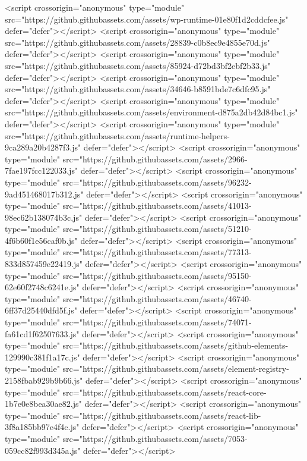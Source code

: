 <script crossorigin="anonymous" type="module" src="https://github.githubassets.com/assets/wp-runtime-01e80f1d2cddcfee.js" defer="defer"></script>
<script crossorigin="anonymous" type="module" src="https://github.githubassets.com/assets/28839-c0b8ec9e4855e70d.js" defer="defer"></script>
<script crossorigin="anonymous" type="module" src="https://github.githubassets.com/assets/85924-d72bd3bf2ebf2b33.js" defer="defer"></script>
<script crossorigin="anonymous" type="module" src="https://github.githubassets.com/assets/34646-b8591bde7c6dfc95.js" defer="defer"></script>
<script crossorigin="anonymous" type="module" src="https://github.githubassets.com/assets/environment-d875a2db42d84bc1.js" defer="defer"></script>
<script crossorigin="anonymous" type="module" src="https://github.githubassets.com/assets/runtime-helpers-9ca289a20b4287f3.js" defer="defer"></script>
<script crossorigin="anonymous" type="module" src="https://github.githubassets.com/assets/2966-7fae197fcc122033.js" defer="defer"></script>
<script crossorigin="anonymous" type="module" src="https://github.githubassets.com/assets/96232-9ad451468017b312.js" defer="defer"></script>
<script crossorigin="anonymous" type="module" src="https://github.githubassets.com/assets/41013-98ec62b138074b3c.js" defer="defer"></script>
<script crossorigin="anonymous" type="module" src="https://github.githubassets.com/assets/51210-4f6b60f1e56caf0b.js" defer="defer"></script>
<script crossorigin="anonymous" type="module" src="https://github.githubassets.com/assets/77313-833d857459e22419.js" defer="defer"></script>
<script crossorigin="anonymous" type="module" src="https://github.githubassets.com/assets/95150-62e60f2748c6241e.js" defer="defer"></script>
<script crossorigin="anonymous" type="module" src="https://github.githubassets.com/assets/46740-6ff37d25440dfd5f.js" defer="defer"></script>
<script crossorigin="anonymous" type="module" src="https://github.githubassets.com/assets/74071-fa61cd1f62507633.js" defer="defer"></script>
<script crossorigin="anonymous" type="module" src="https://github.githubassets.com/assets/github-elements-129990c381f1a17c.js" defer="defer"></script>
<script crossorigin="anonymous" type="module" src="https://github.githubassets.com/assets/element-registry-2158fbab929b9b66.js" defer="defer"></script>
<script crossorigin="anonymous" type="module" src="https://github.githubassets.com/assets/react-core-1b7e0e8bea30ae82.js" defer="defer"></script>
<script crossorigin="anonymous" type="module" src="https://github.githubassets.com/assets/react-lib-3f8a185bb97e4f4c.js" defer="defer"></script>
<script crossorigin="anonymous" type="module" src="https://github.githubassets.com/assets/7053-059cc82f993d345a.js" defer="defer"></script>
